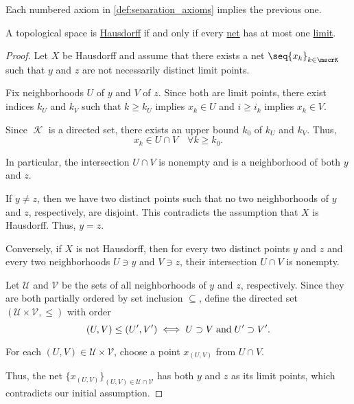 \begin{proposition}\label{thm:separation_axioms_cascade}
  Each numbered axiom in \cref{def:separation_axioms} implies the previous one.
\end{proposition}

\begin{proposition}\label{thm:t2_iff_singleton_limits}
  A topological space is \hyperref[def:separation_axioms/T2]{Hausdorff} if and only if every \hyperref[def:topological_net]{net} has at most one \hyperref[def:net_limit_point]{limit}.
\end{proposition}
\begin{proof}
  \SufficiencySubProof Let \( X \) be Hausdorff and assume that there exists a net \( \seq{ x_k }_{k \in \mscrK} \) such that \( y \) and \( z \) are not necessarily distinct limit points.

  Fix neighborhoods \( U \) of \( y \) and \( V \) of \( z \). Since both are limit points, there exist indices \( k_U \) and \( k_V \) such that \( k \geq k_U \) implies \( x_k \in U \) and \( i \geq i_k \) implies \( x_k \in V \).

  Since \( \mscrK \) is a directed set, there exists an upper bound \( k_0 \) of \( k_U \) and \( k_V \). Thus,
  \begin{equation*}
    x_k \in U \cap V \quad\forall k \geq k_0.
  \end{equation*}

  In particular, the intersection \( U \cap V \) is nonempty and is a neighborhood of both \( y \) and \( z \).

  If \( y \neq z \), then we have two distinct points such that no two neighborhoods of \( y \) and \( z \), respectively, are disjoint. This contradicts the assumption that \( X \) is Hausdorff. Thus, \( y = z \).

  \NecessitySubProof Conversely, if \( X \) is not Hausdorff, then for every two distinct points \( y \) and \( z \) and every two neighborhoods \( U \ni y \) and \( V \ni z \), their intersection \( U \cap V \) is nonempty.

  Let \( \mathcal{U} \) and \( \mathcal{V} \) be the sets of all neighborhoods of \( y \) and \( z \), respectively. Since they are both partially ordered by set inclusion \( \subseteq \), define the directed set \( (\mathcal{U} \times \mathcal{V}, \leq) \) with order
  \begin{equation*}
    (U, V) \leq (U', V') \iff U \supset V \T{and} U' \supset V'.
  \end{equation*}

  For each \( (U, V) \in \mathcal{U} \times \mathcal{V} \), choose a point \( x_{(U, V)} \) from \( U \cap V \).

  Thus, the net \( \{ x_{(U, V)} \}_{(U, V) \in \mathcal{U} \cap \mathcal{V}} \) has both \( y \) and \( z \) as its limit points, which contradicts our initial assumption.
\end{proof}

